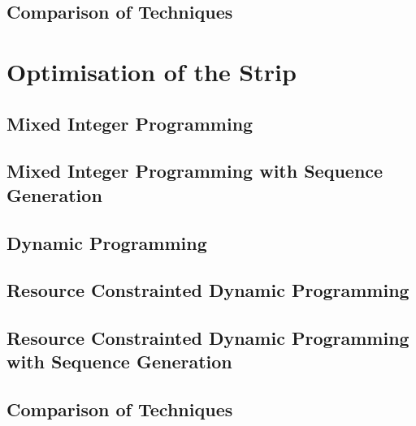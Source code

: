 
\subsection{Comparison of Techniques}

\section{Optimisation of the Strip}
\subsection{Mixed Integer Programming}
\subsection{Mixed Integer Programming with Sequence Generation}
\subsection{Dynamic Programming}
\subsection{Resource Constrainted Dynamic Programming}
\subsection{Resource Constrainted Dynamic Programming with Sequence Generation}
\subsection{Comparison of Techniques}



